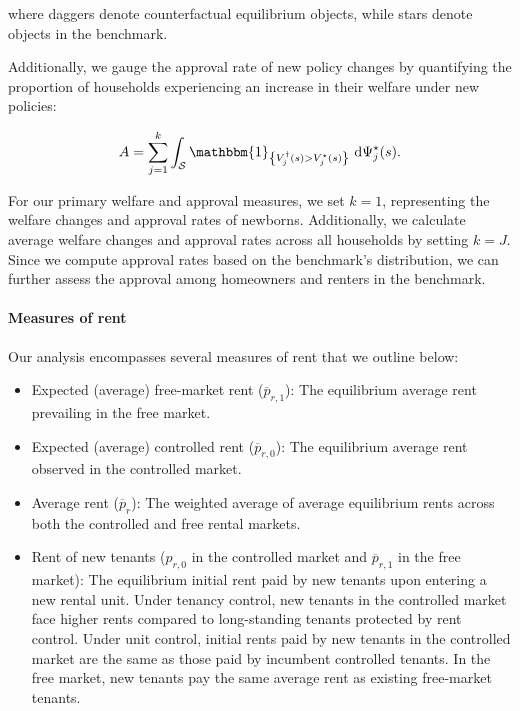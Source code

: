 \documentclass[parskip=full]{article}
\newcommand{\indicator}[1]{\mathbbm{1}_{\left\{ {#1} \right\} }}
\begin{document}
\noindent where daggers denote counterfactual equilibrium objects, while stars denote objects in the benchmark. 

Additionally, we gauge the approval rate of new policy changes by quantifying the proportion of households experiencing an increase in their welfare under new policies:

\begin{equation}
A = \sum_{j=1}^{k}\int_{\mathcal{S}} \indicator{V^{\dagger}_{j}(s)>V^{\star}_{j}(s)}\ \mathrm{d}\Psi^{\star}_{j}(s).
\end{equation}

\noindent For our primary welfare and approval measures, we set $k=1$, representing the welfare changes and approval rates of newborns. Additionally, we calculate average welfare changes and approval rates across all households by setting $k=J$. Since we compute approval rates based on the benchmark's distribution, we can further assess the approval among homeowners and renters in the benchmark.

\paragraph{Measures of rent} Our analysis encompasses several measures of rent that we outline below:

\begin{itemize}
    \item Expected (average) free-market rent ($\overline{p}_{r,1}$): The equilibrium average rent prevailing in the free market.
    \item Expected (average) controlled rent ($\overline{p}_{r,0}$): The equilibrium average rent observed in the controlled market.
    \item Average rent ($\overline{p}_{r}$): The weighted average of average equilibrium rents across both the controlled and free rental markets.
    \item Rent of new tenants ($p_{r,0}$ in the controlled market and $\overline{p}_{r,1}$ in the free market): The equilibrium initial rent paid by new tenants upon entering a new rental unit. Under tenancy control, new tenants in the controlled market face higher rents compared to long-standing tenants protected by rent control. Under unit control, initial rents paid by new tenants in the controlled market are the same as those paid by incumbent controlled tenants. In the free market, new tenants pay the same average rent as existing free-market tenants.
\end{itemize}
\end{document}
